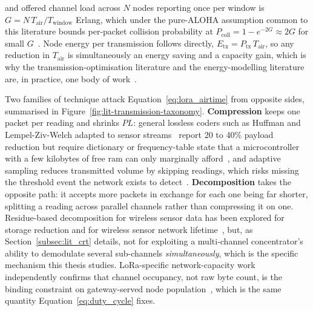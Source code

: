 \documentclass[12pt,a4paper,oneside]{book}
\begin{document}
and offered channel load across $N$ nodes reporting once per window is
$G = N\,T_{\text{air}}/T_{\text{window}}$ Erlang, which under the pure-ALOHA
assumption common to this literature bounds per-packet collision probability
at $P_{\text{coll}} = 1 - e^{-2G} \approx 2G$ for small
$G$~\cite{bor2016lorawan, adelantado2017understanding}. Node energy per
transmission follows directly, $E_{\text{tx}} = P_{\text{tx}}\,T_{\text{air}}$,
so any reduction in $T_{\text{air}}$ is simultaneously an energy saving and a
capacity gain, which is why the transmission-optimisation literature and the
energy-modelling literature are, in practice, one
body of work~\cite{barr1994energy, polastre2005versatile, gonzalez2000energy,
mohammed2025loraEnergy, sanchez2021energy, heinzelman2000energy}.

Two families of technique attack Equation~\ref{eq:lora_airtime} from
opposite sides, summarised in Figure~\ref{fig:lit-transmission-taxonomy}.
\textbf{Compression} keeps one packet per reading and shrinks $PL$: general
lossless coders such as Huffman and Lempel-Ziv-Welch adapted to sensor
streams~\cite{li2018lossless, marcelloni2009energy, ziv1977universal,
huffman1952method, salomon2007data} report 20 to 40\% payload reduction but
require dictionary or frequency-table state that a microcontroller with a
few kilobytes of free \gls{ram} can only marginally
afford~\cite{chen2025compression, lzw_dictionary_size}, and adaptive
sampling reduces transmitted volume by skipping readings, which risks
missing the threshold event the network exists to
detect~\cite{kjellsson2008adaptive}. \textbf{Decomposition} takes the
opposite path: it accepts more packets in exchange for each one being
far shorter, splitting a reading across parallel channels rather than
compressing it on one. Residue-based decomposition for wireless sensor
data has been explored for storage reduction and for wireless sensor
network lifetime~\cite{vidhya2021crt, crtcompression2018, khan2023fuzzycrt,
rahman2022rnsenergy, djeddi2025parallelCRT}, but, as
Section~\ref{subsec:lit_crt} details, not for exploiting a multi-channel
concentrator's ability to demodulate several sub-channels
\emph{simultaneously}, which is the specific mechanism this thesis studies.
LoRa-specific network-capacity work independently confirms that channel
occupancy, not raw byte count, is the binding constraint on
gateway-served node population~\cite{centenaro2016lorawanlimits,
zhang2022lorawan, chapungo2025lorawan, bicamumakuba2025lorawan,
turlykozhayeva2024proactive, mozambique2021lorawan}, which is the same
quantity Equation~\ref{eq:duty_cycle} fixes.
\end{document}
